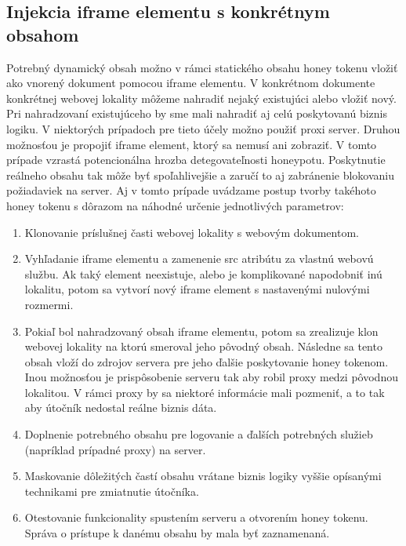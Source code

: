 \documentclass[conference, 11pt,slovak,a4paper,twoside]{IEEEtran}
\begin{document}
\subsection{Injekcia iframe elementu s konkrétnym obsahom}

Potrebný dynamický obsah možno v rámci statického obsahu honey tokenu vložiť ako vnorený dokument pomocou iframe elementu. V konkrétnom dokumente konkrétnej webovej lokality môžeme nahradiť nejaký existujúci alebo vložiť nový. Pri nahradzovaní existujúceho by sme mali nahradiť aj celú poskytovanú biznis logiku. V niektorých prípadoch pre tieto účely možno použiť proxi server. Druhou možnosťou je propojiť iframe element, ktorý sa nemusí ani zobraziť. V tomto prípade vzrastá potencionálna hrozba detegovateľnosti honeypotu. Poskytnutie reálneho obsahu tak môže byť spoľahlivejšie a zaručí to aj zabránenie blokovaniu požiadaviek na server. Aj v tomto prípade uvádzame postup tvorby takéhoto honey tokenu s dôrazom na náhodné určenie jednotlivých parametrov:

\begin{enumerate}
	\item Klonovanie príslušnej časti webovej lokality s webovým dokumentom.

	\item Vyhľadanie iframe elementu a zamenenie src atribútu za vlastnú webovú službu. Ak taký element neexistuje, alebo je komplikované napodobniť inú lokalitu, potom sa vytvorí nový iframe element s nastavenými nulovými rozmermi.
	
	\item Pokiaľ bol nahradzovaný obsah iframe elementu, potom sa zrealizuje klon webovej lokality na ktorú smeroval jeho pôvodný obsah. Následne sa tento obsah vloží do zdrojov servera pre jeho ďalšie poskytovanie honey tokenom. Inou možnosťou je prispôsobenie serveru tak aby robil proxy medzi pôvodnou lokalitou. V rámci proxy by sa niektoré informácie mali pozmeniť, a to tak aby útočník nedostal reálne biznis dáta.
	
	\item Doplnenie potrebného obsahu pre logovanie a ďalších potrebných služieb (napríklad prípadné proxy) na server.
	
	\item Maskovanie dôležitých častí obsahu vrátane biznis logiky vyššie opísanými technikami pre zmiatnutie útočníka.
	
	\item Otestovanie funkcionality spustením serveru a otvorením honey tokenu. Správa o prístupe k danému obsahu by mala byť zaznamenaná.
\end{enumerate}
\end{document}
